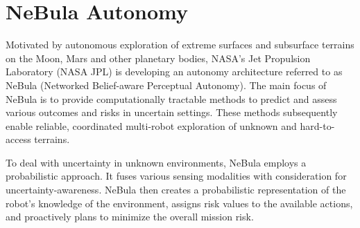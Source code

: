 \documentclass[letterpaper, 10pt, conference]{ieeeconf}      %
\newcommand{\rev}[1]{{\color{blue} #1 }} %
\begin{document}
\section{NeBula Autonomy}\label{sec:nebula}
Motivated by autonomous exploration of extreme surfaces and subsurface terrains on the \rev{Moon, Mars}and other planetary bodies, \rev{NASA's Jet Propulsion Laboratory (NASA JPL)}is developing an autonomy architecture referred to as NeBula (Networked Belief-aware Perceptual Autonomy). 
The main focus of NeBula is to provide computationally tractable methods to predict and assess various outcomes and risks in uncertain settings. \rev{These methods subsequently}enable reliable, coordinated multi-robot exploration of unknown and hard-to-access terrains. %

\rev{To deal with uncertainty in unknown environments, NeBula employs a probabilistic approach.
It fuses various sensing modalities with consideration for uncertainty-awareness. NeBula then creates a probabilistic representation of the robot's knowledge of the environment, assigns risk values to the available actions, and proactively plans to minimize the overall mission risk.} %

\end{document}
